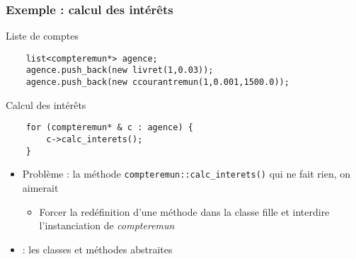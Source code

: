 \begin{frame}[fragile]\frametitle{Exemple : calcul des intérêts}
\begin{codeblock}{Liste de comptes}
\begin{lstlisting}
    list<compteremun*> agence;
    agence.push_back(new livret(1,0.03));
    agence.push_back(new ccourantremun(1,0.001,1500.0));
\end{lstlisting}
\end{codeblock}

\begin{codeblock}{Calcul des intérêts}
\begin{lstlisting}
    for (compteremun* & c : agence) {
        c->calc_interets();
    }
\end{lstlisting}
\end{codeblock}

\begin{itemize}
\item \alert{Problème} : la méthode \verb!compteremun::calc_interets()! qui ne fait rien, on aimerait
\begin{itemize}
\item Forcer la redéfinition d'une méthode dans la classe fille et interdire l'instanciation de \textit{compteremun}
\end{itemize}
\item {} : les classes et méthodes abstraites
\end{itemize}
\end{frame}